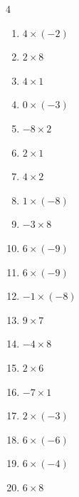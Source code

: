 \begin{multicols}{4}
\begin{enumerate}
  \item $4\times (-2)$
        \phantom{$=-8$}

  \item $2\times 8$
        \phantom{$=16$}

  \item $4\times 1$
        \phantom{$=4$}

  \item $0\times (-3)$
        \phantom{$=0$}

  \item $-8\times 2$
        \phantom{$=-16$}

  \item $2\times 1$
        \phantom{$=2$}

  \item $4\times 2$
        \phantom{$=8$}

  \item $1\times (-8)$
        \phantom{$=-8$}

  \item $-3\times 8$
        \phantom{$=-24$}

  \item $6\times (-9)$
        \phantom{$=-54$}

  \item $6\times (-9)$
        \phantom{$=-54$}

  \item $-1\times (-8)$
        \phantom{$=8$}

  \item $9\times 7$
        \phantom{$=63$}

  \item $-4\times 8$
        \phantom{$=-32$}

  \item $2\times 6$
        \phantom{$=12$}

  \item $-7\times 1$
        \phantom{$=-7$}

  \item $2\times (-3)$
        \phantom{$=-6$}

  \item $6\times (-6)$
        \phantom{$=-36$}

  \item $6\times (-4)$
        \phantom{$=-24$}

\columnbreak %

\resetques

  \item $6\times 8$
        \phantom{$=48$}


\end{enumerate}
\end{multicols}
